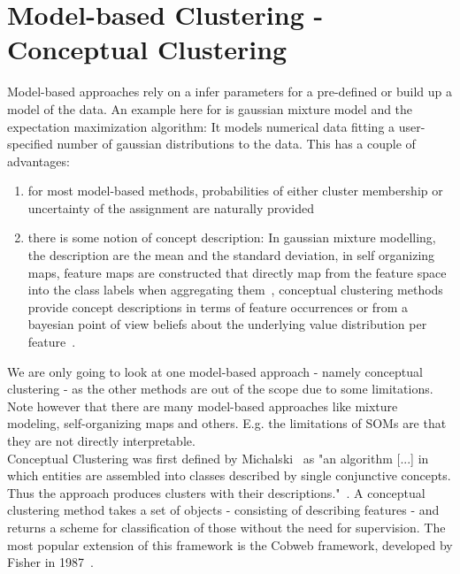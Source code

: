\section{Model-based Clustering - Conceptual Clustering}
Model-based approaches rely on a infer parameters for a pre-defined or build up a model of the data. An example here for is gaussian mixture model and the expectation maximization algorithm: It models numerical data fitting a user-specified number of gaussian distributions to the data. This has a couple of advantages:
\begin{enumerate}
    \item for most model-based methods, probabilities of either cluster membership or uncertainty of the assignment are naturally provided 
    \item there is some notion of concept description: In gaussian mixture modelling, the description are the mean and the standard deviation, in self organizing maps, feature maps are constructed that directly map from the feature space into the class labels when aggregating them~\cite{yosinski-2015-ICML-DL-understanding-neural-networks}, conceptual clustering methods provide concept descriptions in terms of feature occurrences or from a bayesian point of view beliefs about the underlying value distribution per feature~\cite{Fisher1987}.
\end{enumerate}
We are only going to look at one model-based approach - namely conceptual clustering - as the other methods are out of the scope due to some limitations. Note however that there are many model-based approaches like mixture modeling, self-organizing maps and others. E.g. the limitations of SOMs are that they are not directly interpretable. \\

Conceptual Clustering was first defined by Michalski~\cite{michalski1980knowledge} as "an algorithm [...] in which entities are assembled into classes described by single conjunctive concepts. Thus the approach produces clusters with their descriptions."~\cite{michalski1980knowledge}. A conceptual clustering method takes a set of objects - consisting of describing features - and returns a scheme for classification of those without the need for supervision. The most popular extension of this framework is the Cobweb framework, developed by Fisher in 1987~\cite{Fisher1987}.

